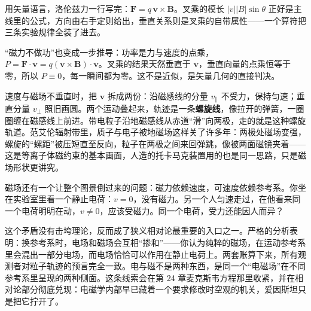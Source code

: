 \begin{mathbridge}
用矢量语言，洛伦兹力一行写完：\(\bm F=q\,\bm v\times\bm B\)。叉乘的模长 \(|v||B|\sin\theta\) 正好是主线里的公式，方向由右手定则给出，垂直关系则是叉乘的自带属性——一个算符把三条实验规律全装了进去。

“磁力不做功”也变成一步推导：功率是力与速度的点乘，\(P=\bm F\cdot\bm v=q(\bm v\times\bm B)\cdot\bm v\)。叉乘的结果天然垂直于 \(\bm v\)，垂直向量的点乘恒等于零，所以 \(P\equiv0\)，每一瞬间都为零。这不是近似，是矢量几何的直接判决。

速度与磁场不垂直时，把 \(\bm v\) 拆成两份：沿磁感线的分量 \(v_{\parallel}\) 不受力，保持匀速；垂直分量 \(v_{\perp}\) 照旧画圆。两个运动叠起来，轨迹是一条\textbf{螺旋线}，像拉开的弹簧，一圈圈缠在磁感线上前进。带电粒子沿地磁感线从赤道“滑”向两极，走的就是这种螺旋轨道。范艾伦辐射带里，质子与电子被地磁场这样关了许多年：两极处磁场变强，螺旋的“螺距”被压短直至反向，粒子在两极之间来回弹跳，像被两面磁镜夹着——这是等离子体磁约束的基本画面，人造的托卡马克装置用的也是同一思路，只是磁场形状更讲究。
\end{mathbridge}

\begin{challenge}
磁场还有一个让整个图景倒过来的问题：磁力依赖速度，可速度依赖参考系。你坐在实验室里看一个静止电荷：\(v=0\)，没有磁力。另一个人匀速走过，在他看来同一个电荷明明在动，\(v\neq0\)，应该受磁力。同一个电荷，受力还能因人而异？

这个矛盾没有击垮理论，反而成了狭义相对论最重要的入口之一。严格的分析表明：换参考系时，电场和磁场会互相“掺和”——你认为纯粹的磁场，在运动参考系里会混出一部分电场，而电场恰恰可以作用在静止电荷上。两套账算下来，所有观测者对粒子轨迹的预言完全一致。电与磁不是两种东西，是同一个“电磁场”在不同参考系里呈现的两种侧面。这条线索会在第 24 章麦克斯韦方程那里收紧，并在相对论部分彻底兑现：电磁学内部早已藏着一个要求修改时空观的机关，爱因斯坦只是把它拧开了。
\end{challenge}


